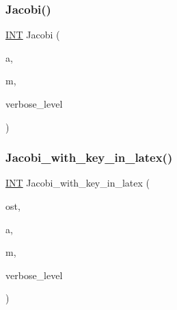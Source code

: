 \subsubsection{\texorpdfstring{Jacobi()}{Jacobi()}}
{\footnotesize\ttfamily \mbox{\hyperlink{galois_8h_a09fddde158a3a20bd2dcadb609de11dc}{I\+NT}} Jacobi (\begin{DoxyParamCaption}\item[{\mbox{\hyperlink{galois_8h_a09fddde158a3a20bd2dcadb609de11dc}{I\+NT}}}]{a,  }\item[{\mbox{\hyperlink{galois_8h_a09fddde158a3a20bd2dcadb609de11dc}{I\+NT}}}]{m,  }\item[{\mbox{\hyperlink{galois_8h_a09fddde158a3a20bd2dcadb609de11dc}{I\+NT}}}]{verbose\+\_\+level }\end{DoxyParamCaption})}

\mbox{\label{number__theory_8_c_a31ac7467ae04e35889afd9998e24111b}} 
\subsubsection{\texorpdfstring{Jacobi\+\_\+with\+\_\+key\+\_\+in\+\_\+latex()}{Jacobi\_with\_key\_in\_latex()}}
{\footnotesize\ttfamily \mbox{\hyperlink{galois_8h_a09fddde158a3a20bd2dcadb609de11dc}{I\+NT}} Jacobi\+\_\+with\+\_\+key\+\_\+in\+\_\+latex (\begin{DoxyParamCaption}\item[{ostream \&}]{ost,  }\item[{\mbox{\hyperlink{galois_8h_a09fddde158a3a20bd2dcadb609de11dc}{I\+NT}}}]{a,  }\item[{\mbox{\hyperlink{galois_8h_a09fddde158a3a20bd2dcadb609de11dc}{I\+NT}}}]{m,  }\item[{\mbox{\hyperlink{galois_8h_a09fddde158a3a20bd2dcadb609de11dc}{I\+NT}}}]{verbose\+\_\+level }\end{DoxyParamCaption})}

\mbox{\label{number__theory_8_c_a731e9304ceef1c1abe954dce2de1b985}} 
